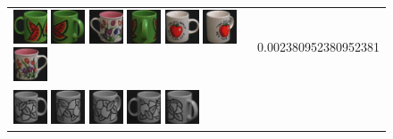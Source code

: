 \begin{figure}[!bp]
\begin{tabular}{m{11cm} | m{3cm} |}
\includegraphics[width=1cm]{coil/beeld-31.eps}
\includegraphics[width=1cm]{coil/beeld-34.eps}
\includegraphics[width=1cm]{coil/beeld-7.eps}
\includegraphics[width=1cm]{coil/beeld-35.eps}
\includegraphics[width=1cm]{coil/beeld-36.eps}
\includegraphics[width=1cm]{coil/beeld-39.eps}
\includegraphics[width=1cm]{coil/beeld-6.eps}
& {\scriptsize 0.002380952380952381}
\\
\includegraphics[width=1cm]{coil/beeld-48.eps}
\includegraphics[width=1cm]{coil/beeld-50.eps}
\includegraphics[width=1cm]{coil/beeld-51.eps}
\includegraphics[width=1cm]{coil/beeld-49.eps}
\includegraphics[width=1cm]{coil/beeld-52.eps}

\end{tabular}
\end{figure}
